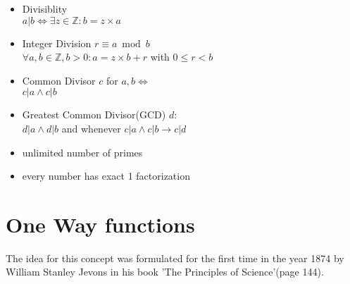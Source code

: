  

\begin{itemize}
 \item Divisiblity
 \\
$a | b \iff \exists z \in \mathbb{Z}: b = z \times a$
 \item Integer Division $r \equiv a \bmod b$ 
 \\
 $ \forall a, b \in \mathbb{Z}, b > 0:  a = z \times b + r $ with $ 0 \leq r < b$
 \item Common Divisor $c$ for $a, b \iff$
 \\
 $c | a \wedge c | b$
 \item Greatest Common Divisor(GCD) $d$:
 \\
 $d | a \wedge d | b$ and whenever $c | a \wedge c | b \rightarrow c | d$
 
 \item unlimited number of primes
 \item every number has exact 1 factorization 
\end{itemize}

\section{One Way functions}

The idea for this concept was formulated for the first time in the year 1874 by William Stanley Jevons in his book
'The Principles of Science'(page 144).
